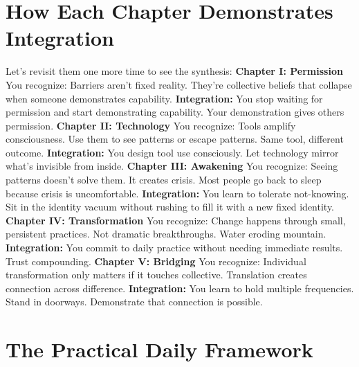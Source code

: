 \documentclass[12pt,openany]{book}
\begin{document}
\section{How Each Chapter Demonstrates Integration}

Let's revisit them one more time to see the synthesis:
\textbf{Chapter I: Permission}
You recognize: Barriers aren't fixed reality. They're collective beliefs that collapse when someone demonstrates capability.
\textbf{Integration:} You stop waiting for permission and start demonstrating capability. Your demonstration gives others permission.
\textbf{Chapter II: Technology}
You recognize: Tools amplify consciousness. Use them to see patterns or escape patterns. Same tool, different outcome.
\textbf{Integration:} You design tool use consciously. Let technology mirror what's invisible from inside.
\textbf{Chapter III: Awakening}
You recognize: Seeing patterns doesn't solve them. It creates crisis. Most people go back to sleep because crisis is uncomfortable.
\textbf{Integration:} You learn to tolerate not-knowing. Sit in the identity vacuum without rushing to fill it with a new fixed identity.
\textbf{Chapter IV: Transformation}
You recognize: Change happens through small, persistent practices. Not dramatic breakthroughs. Water eroding mountain.
\textbf{Integration:} You commit to daily practice without needing immediate results. Trust compounding.
\textbf{Chapter V: Bridging}
You recognize: Individual transformation only matters if it touches collective. Translation creates connection across difference.
\textbf{Integration:} You learn to hold multiple frequencies. Stand in doorways. Demonstrate that connection is possible.

\section{The Practical Daily Framework}
\end{document}
